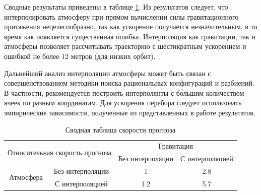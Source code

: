 Сводные результаты приведены в таблице \ref{tab:atmo_propag_acc}. Из результатов следует, что интерполировать атмосферу
при прямом вычислении силы гравитационного притяжения нецелесообразно, так как ускорение
получается незначительным, в то время как появляется существенная ошибка. Интерполяция
как гравитации, так и атмосферы позволяет рассчитывать траекторию с шестикратным ускорением и
ошибкой не более 12 метров (для низких орбит).

Дальнейший анализ интерполяции атмосферы может быть связан с совершенствованием методики
поиска рациональных конфигураций и разбиений. В частности, рекомендуется
построить интерполянты с б\`{о}льшим количеством ячеек по разным координатам. Для ускорения
перебора следует использовать эмпирические зависимости, полученные из представленных в работе
результатов.

\begin{table}[h!]
    \centering
    \renewcommand{\arraystretch}{1.5}
    \begin{tabular}{|cc|cc|}
    \hline
    \multicolumn{2}{|c|}{\multirow{2}{*}{Относительная скорость прогноза}} & \multicolumn{2}{c|}{Гравитация}                         \\ \cline{3-4} 
    \multicolumn{2}{|c|}{}                                                 & \multicolumn{1}{c|}{Без интерполяции} & С интерполяцией \\ \hline
    \multicolumn{1}{|c|}{\multirow{2}{*}{Атмосфера}}   & Без интерполяции  & \multicolumn{1}{c|}{1}                & 2.8             \\ \cline{2-4} 
    \multicolumn{1}{|c|}{}                             & С интерполяцией   & \multicolumn{1}{c|}{1.2}              & 5.7             \\ \hline
    \end{tabular}
    \caption{Сводная таблица скорости прогноза}
    \label{tab:atmo_propag_acc}
\end{table}
\clearpage